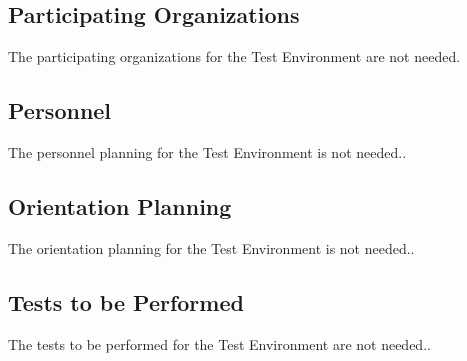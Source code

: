 \subsection{Participating Organizations}
\label{loc:Organizations\TestEnvName}


The participating organizations for the \TestEnvName\xspace Test Environment are not needed.


\subsection{Personnel}
\label{loc:Personnel\TestEnvName}


The personnel planning for the \TestEnvName\xspace Test Environment is not needed..


\subsection{Orientation Planning}
\label{loc:Orientation\TestEnvName}


The orientation planning for the \TestEnvName\xspace Test Environment is not needed..


\subsection{Tests to be Performed}
\label{loc:Tests\TestEnvName}


The tests to be performed for the \TestEnvName\xspace Test Environment are not needed..%

